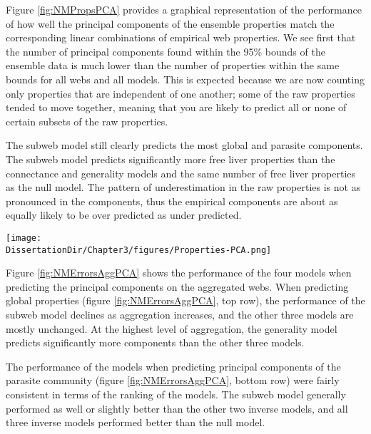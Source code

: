 \documentclass[/home/nkappler/Research/Dissertation/
 dissertation.tex]{subfiles}
\begin{document}
\begin{bibunit}
Figure \ref{fig:NMPropsPCA} provides a graphical representation of the
performance of how well the principal components of the ensemble properties
match the corresponding linear combinations of empirical web properties. We see
first that the number of principal components found within the 95\% bounds of
the ensemble data is much lower than the number of properties within the same
bounds for all webs and all models. This is expected because we are now
counting only properties that are independent of one another; some of the raw
properties tended to move together, meaning that you are likely to predict all
or none of certain subsets of the raw properties.

The subweb model still clearly predicts the most global and parasite
components. The subweb model predicts significantly more free liver properties
than the connectance and generality models and the same number of free
liver properties as the null model. The pattern of underestimation in the raw
properties is not as pronounced in the components, thus the empirical
components are about as equally likely to be over predicted as under
predicted.


\begin{sidewaysfigure}
    \centering
    \texttt{[image: \\DissertationDir/Chapter3/figures/Properties-PCA.png]}
    \caption[Niche model principal components predicted]{This figure shows the percentiles of the empirical principle
        component scores. Dots represent a logit transformation of the
        percentile of each property within the ensemble.  Dots on the
        horizontal axes represent empirical property values that are completely
        outside the observed bounds of that property in the ensemble of
        simulated food webs.
    \label{fig:NMPropsPCA}}
\end{sidewaysfigure}

Figure \ref{fig:NMErrorsAggPCA} shows the performance of the four models when
predicting the principal components on the aggregated webs. When predicting
global properties (figure \ref{fig:NMErrorsAggPCA}, top row), the performance
of the subweb model declines as aggregation increases, and the other three
models are mostly unchanged. At the highest level of aggregation, the
generality model predicts significantly more components than the other three
models.

The performance of the models when predicting principal components of the
parasite community (figure \ref{fig:NMErrorsAggPCA}, bottom row) were fairly
consistent in terms of the ranking of the models. The subweb model
generally performed as well or slightly better than the other two inverse
models, and all three inverse models performed better than the null model. 
 

\end{bibunit}
\end{document}
